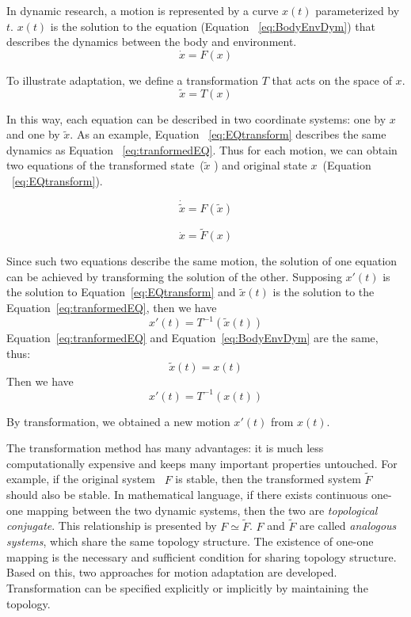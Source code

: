 In dynamic \cms research, a motion is represented by  a curve  $x(t)$ parameterized by $t$.
$x(t)$ is the solution to the equation (Equation ~\ref{eq:BodyEnvDym}) that describes the dynamics between the body and environment.
\begin{equation}
\dot{x}=F(x)
\label{eq:BodyEnvDym}
\end{equation}


To illustrate adaptation, we define a transformation $T$ that acts on the space of $x$.
\[
\tilde{x}=T(x)
\]

In this way, each equation can be described in two coordinate systems: one by $x$ and one by $\tilde{x}$.
As an example, Equation ~\ref{eq:EQtransform} describes the same dynamics as  Equation ~\ref{eq:tranformedEQ}.
Thus for each motion, we can obtain two equations of the transformed state~($\tilde{x}$ ) and original state $x$~(Equation ~\ref{eq:EQtransform}).

\begin{equation}
\dot{\tilde{x}}=F(\tilde{x})
\label{eq:tranformedEQ}
\end{equation}

\begin{equation}
\dot{x}=\tilde{F}(x)
\label{eq:EQtransform}
\end{equation}

Since such two equations describe the same motion, the solution of one equation can be achieved by transforming the solution of the other.
Supposing $x'(t)$ is the solution to Equation~\ref{eq:EQtransform} and $\tilde{x}(t)$ is the solution to the Equation~\ref{eq:tranformedEQ}, then we have
\[
x'(t)=T^{-1}(\tilde{x}(t))
\]
Equation~\ref{eq:tranformedEQ} and Equation~\ref{eq:BodyEnvDym} are the same, thus: 
\[
\tilde{x}(t)=x(t)
\]
Then we have
\[
x'(t)=T^{-1}(x(t))
\]

By transformation, we obtained a new motion $x'(t)$ from $x(t)$.





%
%
The  transformation method has many advantages: it is much less computationally expensive and keeps many important properties untouched.
For example, if the original system ~$F$ is stable, then the transformed system $\tilde{F}$ should also be stable. 
%
In mathematical language, if there exists continuous one-one mapping between the two dynamic systems, then the two are \emph{topological conjugate}.
This relationship is presented by $F \simeq \tilde{F}$.
$F$ and $\tilde{F}$ are called \emph{analogous systems}, which share the same topology structure.
The existence of one-one mapping is the necessary and sufficient condition for sharing topology structure.
Based on this, two  approaches for motion adaptation are developed.
Transformation can be specified explicitly or implicitly by maintaining the topology.



